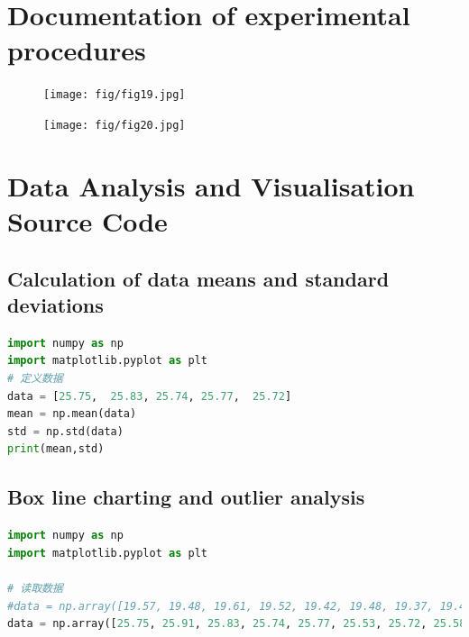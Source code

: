 \documentclass[UTF8]{article}
\begin{document}
\begin{appendix}
	\section{Documentation of experimental procedures}
\begin{figure}[H]
                          			\begin{minipage}[t]{0.5\linewidth}
                          				\centering
                          				\texttt{[image: fig/fig19.jpg]}
                          			
                          				\label{figure.19}
                          			\end{minipage}
                          			\begin{minipage}[t]{0.5\linewidth}
                          				\centering
                          				\texttt{[image: fig/fig20.jpg]}
                          				
                          				\label{figure.20}
                          			\end{minipage}
                          		\end{figure}
	
	\section{Data Analysis and Visualisation Source Code}
	\subsection{Calculation of data means and standard deviations}
	\begin{lstlisting}[language=python]
import numpy as np
import matplotlib.pyplot as plt
# 定义数据
data = [25.75,  25.83, 25.74, 25.77,  25.72]
mean = np.mean(data)
std = np.std(data)
print(mean,std)
	\end{lstlisting}
	
	\subsection{Box line charting and outlier analysis}
	\begin{lstlisting}[language=python]
import numpy as np
import matplotlib.pyplot as plt

# 读取数据
#data = np.array([19.57, 19.48, 19.61, 19.52, 19.42, 19.48, 19.37, 19.43, 19.51])
data = np.array([25.75, 25.91, 25.83, 25.74, 25.77, 25.53, 25.72, 25.58, 25.59])


\end{lstlisting}
\end{appendix}
\end{document}
